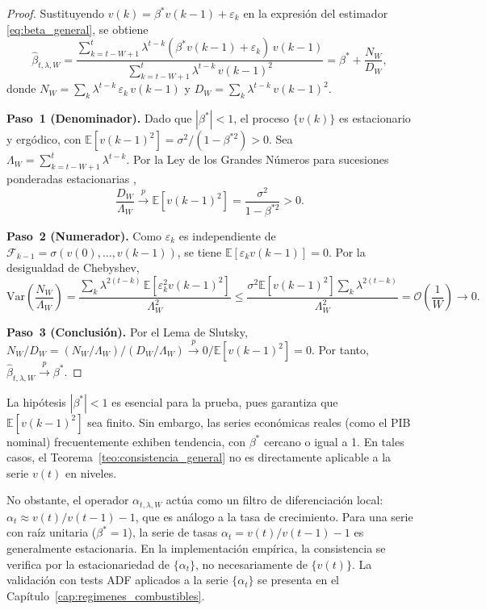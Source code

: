 \begin{proof}
Sustituyendo $v(k) = \beta^* v(k-1) + \varepsilon_k$ en la
expresión del estimador \eqref{eq:beta_general}, se obtiene
\[
\hat{\beta}_{t,\lambda,W}
= \frac{\sum_{k=t-W+1}^{t} \lambda^{t-k}
       (\beta^* v(k-1) + \varepsilon_k)\, v(k-1)}
      {\sum_{k=t-W+1}^{t} \lambda^{t-k}\, v(k-1)^2}
= \beta^* + \frac{N_W}{D_W},
\]
donde
$N_W = \sum_{k} \lambda^{t-k}\, \varepsilon_k\, v(k-1)$ y
$D_W = \sum_{k} \lambda^{t-k}\, v(k-1)^2$.

\textbf{Paso~1 (Denominador).}  Dado que $|\beta^*| < 1$, el proceso
$\{v(k)\}$ es estacionario y ergódico, con
$\mathbb{E}[v(k-1)^2] = \sigma^2/(1 - \beta^{*2}) > 0$.  Sea
$\Lambda_W = \sum_{k=t-W+1}^{t} \lambda^{t-k}$.  Por la Ley de los
Grandes Números para sucesiones ponderadas estacionarias
\cite{Anderson1971},
\[
\frac{D_W}{\Lambda_W} \xrightarrow{p}
\mathbb{E}[v(k-1)^2] = \frac{\sigma^2}{1 - \beta^{*2}} > 0.
\]

\textbf{Paso~2 (Numerador).}  Como $\varepsilon_k$ es independiente
de $\mathcal{F}_{k-1} = \sigma(v(0), \ldots, v(k-1))$, se tiene
$\mathbb{E}[\varepsilon_k v(k-1)] = 0$.  Por la desigualdad de Chebyshev,
\[
\text{Var}\!\left(\frac{N_W}{\Lambda_W}\right)
= \frac{\sum_{k} \lambda^{2(t-k)}\,
       \mathbb{E}[\varepsilon_k^2 v(k-1)^2]}{\Lambda_W^2}
\leq \frac{\sigma^2 \mathbb{E}[v(k-1)^2]
       \sum_{k} \lambda^{2(t-k)}}{\Lambda_W^2}
= \mathcal{O}\!\left(\frac{1}{W}\right) \to 0.
\]

\textbf{Paso~3 (Conclusión).}  Por el Lema de Slutsky,
$N_W / D_W = (N_W/\Lambda_W) / (D_W/\Lambda_W)
\xrightarrow{p} 0 / \mathbb{E}[v(k-1)^2] = 0$.
Por tanto, $\hat{\beta}_{t,\lambda,W} \xrightarrow{p} \beta^*$.
\end{proof}

\begin{remark}
\label{rem:estacionariedad}
La hipótesis $|\beta^*| < 1$ es esencial para la prueba, pues
garantiza que $\mathbb{E}[v(k-1)^2]$ sea finito.  Sin embargo, las
series económicas reales (como el PIB nominal) frecuentemente
exhiben tendencia, con $\beta^*$ cercano o igual a 1.  En tales
casos, el Teorema~\ref{teo:consistencia_general} no es directamente
aplicable a la serie $v(t)$ en niveles.

No obstante, el operador $\alpha_{t,\lambda,W}$ actúa como un
filtro de diferenciación local: $\alpha_t \approx v(t)/v(t-1) - 1$,
que es análogo a la tasa de crecimiento.  Para una serie con raíz
unitaria ($\beta^* = 1$), la serie de tasas
$\alpha_t = v(t)/v(t-1) - 1$ es generalmente estacionaria.  En la
implementación empírica, la consistencia se verifica por la
estacionariedad de $\{\alpha_t\}$, no necesariamente de $\{v(t)\}$.
La validación con tests ADF aplicados a la serie
$\{\alpha_t\}$ se presenta en el
Capítulo~\ref{cap:regimenes_combustibles}.
\end{remark}

